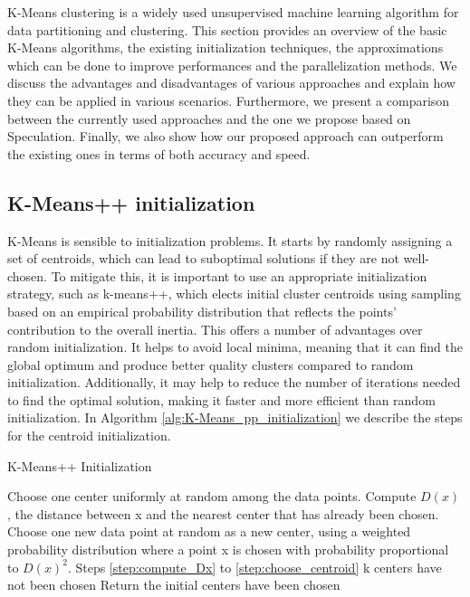 K-Means clustering is a widely used unsupervised machine learning algorithm for data partitioning and clustering. This section provides an overview of the basic K-Means algorithms, the existing initialization techniques, the approximations which can be done to improve performances and the parallelization methods. We discuss the advantages and disadvantages of various approaches and explain how they can be applied in various scenarios. Furthermore, we present a comparison between the currently used approaches and the one we propose based on Speculation. Finally, we also show how our proposed approach can outperform the existing ones in terms of both accuracy and speed.
\subsection{K-Means++ initialization}
\label{section:K-Means_pp}

K-Means is sensible to initialization problems. It starts by randomly assigning a set of centroids, which can lead to suboptimal solutions if they are not well-chosen. To mitigate this, it is important to use an appropriate initialization strategy, such as k-means++, which elects initial cluster centroids using sampling based on an empirical probability distribution that reflects the points' contribution to the overall inertia. This offers a number of advantages over random initialization. It helps to avoid local minima, meaning that it can find the global optimum and produce better quality clusters compared to random initialization. Additionally, it may help to reduce the number of iterations needed to find the optimal solution, making it faster and more efficient than random initialization.
In Algorithm \ref{alg:K-Means_pp_initialization} we describe the steps for the centroid initialization.
\begin{algorithm}[H]
  \caption{K-Means++ Initialization}
  \label{alg:K-Means_pp_initialization}
  \begin{algorithmic}[1]
    \State Choose one center uniformly at random among the data points.
        \label{step:compute_Dx}
        \State Compute $D(x)$, the distance between x and the nearest center that has already been chosen.
    \EndFor
    \State Choose one new data point at random as a new center, using a weighted probability distribution where a point x is chosen with probability proportional to $D(x)^2$.
    \label{step:choose_centroid}
    \Repeat
        \State Steps \ref{step:compute_Dx} to \ref{step:choose_centroid}
    \Until k centers have not been chosen
    \State Return the initial centers have been chosen
  \end{algorithmic}
\end{algorithm}

